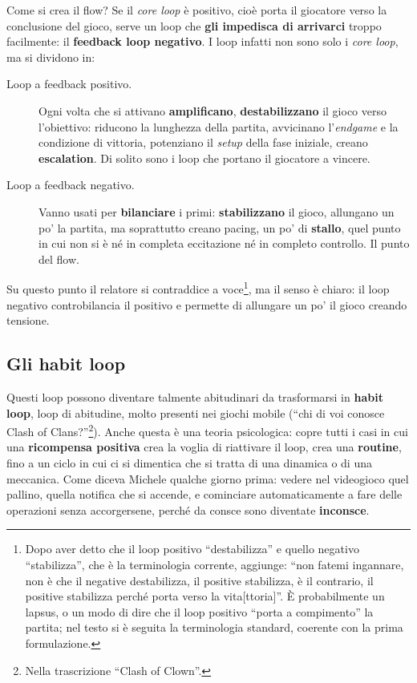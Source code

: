 Come si crea il flow? Se il \emph{core loop} è positivo, cioè porta il giocatore
verso la conclusione del gioco, serve un loop che \textbf{gli impedisca di
arrivarci} troppo facilmente: il \textbf{feedback loop negativo}. I loop infatti
non sono solo i \emph{core loop}, ma si dividono in:
\begin{description}
  \item[Loop a feedback positivo.] Ogni volta che si attivano
        \textbf{amplificano}, \textbf{destabilizzano} il gioco verso
        l'obiettivo: riducono la lunghezza della partita, avvicinano
        l'\emph{endgame} e la condizione di vittoria, potenziano il
        \emph{setup} della fase iniziale, creano \textbf{escalation}. Di solito
        sono i loop che portano il giocatore a vincere.
  \item[Loop a feedback negativo.] Vanno usati per \textbf{bilanciare} i primi:
        \textbf{stabilizzano} il gioco, allungano un po' la partita, ma
        soprattutto creano pacing, un po' di \textbf{stallo}, quel punto in cui
        non si è né in completa eccitazione né in completo controllo. Il punto
        del flow.
\end{description}
Su questo punto il relatore si contraddice a voce\footnote{Dopo aver detto che
il loop positivo ``destabilizza'' e quello negativo ``stabilizza'', che è la
terminologia corrente, aggiunge: ``non fatemi ingannare, non è che il negative
destabilizza, il positive stabilizza, è il contrario, il positive stabilizza
perché porta verso la vita[ttoria]''. È probabilmente un lapsus, o un modo di
dire che il loop positivo ``porta a compimento'' la partita; nel testo si è
seguita la terminologia standard, coerente con la prima formulazione.}, ma il
senso è chiaro: il loop negativo controbilancia il positivo e permette di
allungare un po' il gioco creando tensione.

\subsection{Gli habit loop}

Questi loop possono diventare talmente abitudinari da trasformarsi in
\textbf{habit loop}, loop di abitudine, molto presenti nei giochi mobile (``chi di
voi conosce Clash of Clans?''\footnote{Nella trascrizione ``Clash of Clown''.}).
Anche questa è una teoria psicologica: copre tutti i casi in cui una
\textbf{ricompensa positiva} crea la voglia di riattivare il loop, crea una
\textbf{routine}, fino a un ciclo in cui ci si dimentica che si tratta di una
dinamica o di una meccanica. Come diceva Michele qualche giorno prima: vedere nel
videogioco quel pallino, quella notifica che si accende, e cominciare
automaticamente a fare delle operazioni senza accorgersene, perché da consce sono
diventate \textbf{inconsce}.

